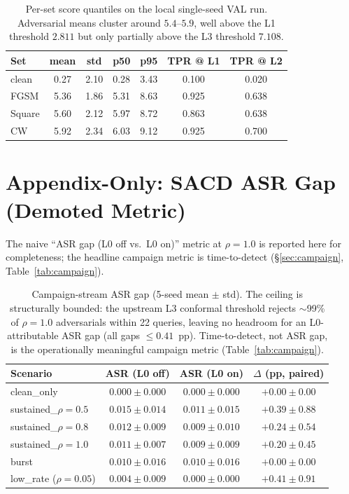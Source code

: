 \begin{table}[h]
\centering
\small
\begin{tabular}{lcccccc}
\toprule
Set & mean & std & p50 & p95 & TPR @ L1 & TPR @ L2 \\
\midrule
clean   & 0.27 & 2.10 & 0.28 & 3.43 & 0.100 & 0.020 \\
FGSM    & 5.36 & 1.86 & 5.31 & 8.63 & 0.925 & 0.638 \\
Square  & 5.60 & 2.12 & 5.97 & 8.72 & 0.863 & 0.638 \\
CW      & 5.92 & 2.34 & 6.03 & 9.12 & 0.925 & 0.700 \\
\bottomrule
\end{tabular}
\caption{Per-set score quantiles on the local single-seed VAL run.
Adversarial means cluster around $5.4$--$5.9$, well above the L1
threshold $2.811$ but only partially above the L3 threshold $7.108$.}
\label{tab:score_hist_local}
\end{table}


\section{Appendix-Only: SACD ASR Gap (Demoted Metric)}
\label{app:asr_gap}

The naive ``ASR gap (L0 off vs.\ L0 on)'' metric at $\rho{=}1.0$ is reported
here for completeness; the headline campaign metric is time-to-detect
(\S\ref{sec:campaign}, Table~\ref{tab:campaign}).

\begin{table}[h]
\centering
\small
\begin{tabular}{lccc}
\toprule
Scenario & ASR (L0 off) & ASR (L0 on) & $\Delta$ (pp, paired) \\
\midrule
clean\_only              & $0.000 \pm 0.000$ & $0.000 \pm 0.000$ & $+0.00 \pm 0.00$ \\
sustained\_$\rho{=}0.5$  & $0.015 \pm 0.014$ & $0.011 \pm 0.015$ & $+0.39 \pm 0.88$ \\
sustained\_$\rho{=}0.8$  & $0.012 \pm 0.009$ & $0.009 \pm 0.010$ & $+0.24 \pm 0.54$ \\
sustained\_$\rho{=}1.0$  & $0.011 \pm 0.007$ & $0.009 \pm 0.009$ & $+0.20 \pm 0.45$ \\
burst                    & $0.010 \pm 0.016$ & $0.010 \pm 0.016$ & $+0.00 \pm 0.00$ \\
low\_rate ($\rho{=}0.05$) & $0.004 \pm 0.009$ & $0.000 \pm 0.000$ & $+0.41 \pm 0.91$ \\
\bottomrule
\end{tabular}
\caption{Campaign-stream ASR gap (5-seed mean $\pm$ std). The ceiling is
structurally bounded: the upstream L3 conformal threshold rejects $\sim$99\%
of $\rho{=}1.0$ adversarials within 22 queries, leaving no headroom for an
L0-attributable ASR gap (all gaps $\leq 0.41$~pp). Time-to-detect, not ASR
gap, is the operationally meaningful campaign metric (Table~\ref{tab:campaign}).}
\label{tab:asr_gap}
\end{table}

